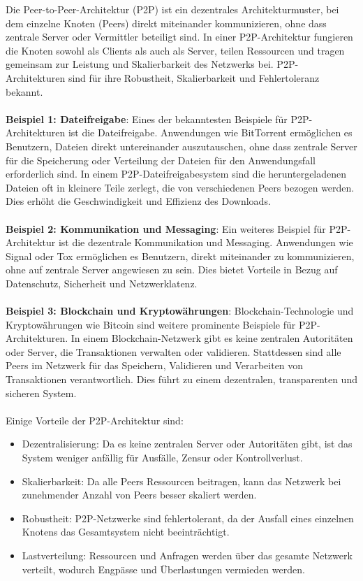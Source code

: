 \documentclass[../vs-script-first-v01.tex]{subfiles}
\begin{document}
Die Peer-to-Peer-Architektur (P2P) ist ein dezentrales Architekturmuster, bei dem einzelne Knoten (Peers) direkt miteinander kommunizieren, ohne dass zentrale Server oder Vermittler beteiligt sind. In einer P2P-Architektur fungieren die Knoten sowohl als Clients als auch als Server, teilen Ressourcen und tragen gemeinsam zur Leistung und Skalierbarkeit des Netzwerks bei. P2P-Architekturen sind für ihre Robustheit, Skalierbarkeit und Fehlertoleranz bekannt.
\\\\
\textbf{Beispiel 1: Dateifreigabe}: Eines der bekanntesten Beispiele für P2P-Architekturen ist die Dateifreigabe. Anwendungen wie BitTorrent ermöglichen es Benutzern, Dateien direkt untereinander auszutauschen, ohne dass zentrale Server für die Speicherung oder Verteilung der Dateien für den Anwendungsfall erforderlich sind. In einem P2P-Dateifreigabesystem sind die heruntergeladenen Dateien oft in kleinere Teile zerlegt, die von verschiedenen Peers bezogen werden. Dies erhöht die Geschwindigkeit und Effizienz des Downloads.
\\\\
\textbf{Beispiel 2: Kommunikation und Messaging}: Ein weiteres Beispiel für P2P-Architektur ist die dezentrale Kommunikation und Messaging. Anwendungen wie Signal oder Tox ermöglichen es Benutzern, direkt miteinander zu kommunizieren, ohne auf zentrale Server angewiesen zu sein. Dies bietet Vorteile in Bezug auf Datenschutz, Sicherheit und Netzwerklatenz.
\\\\
\textbf{Beispiel 3: Blockchain und Kryptowährungen}: Blockchain-Technologie und Kryptowährungen wie Bitcoin sind weitere prominente Beispiele für P2P-Architekturen. In einem Blockchain-Netzwerk gibt es keine zentralen Autoritäten oder Server, die Transaktionen verwalten oder validieren. Stattdessen sind alle Peers im Netzwerk für das Speichern, Validieren und Verarbeiten von Transaktionen verantwortlich. Dies führt zu einem dezentralen, transparenten und sicheren System.
\\\\
Einige Vorteile der P2P-Architektur sind:
\begin{itemize}
\item Dezentralisierung: Da es keine zentralen Server oder Autoritäten gibt, ist das System weniger anfällig für Ausfälle, Zensur oder Kontrollverlust.
\item Skalierbarkeit: Da alle Peers Ressourcen beitragen, kann das Netzwerk bei zunehmender Anzahl von Peers besser skaliert werden.
\item Robustheit: P2P-Netzwerke sind fehlertolerant, da der Ausfall eines einzelnen Knotens das Gesamtsystem nicht beeinträchtigt.
\item Lastverteilung: Ressourcen und Anfragen werden über das gesamte Netzwerk verteilt, wodurch Engpässe und Überlastungen vermieden werden.
\end{itemize}
\end{document}
